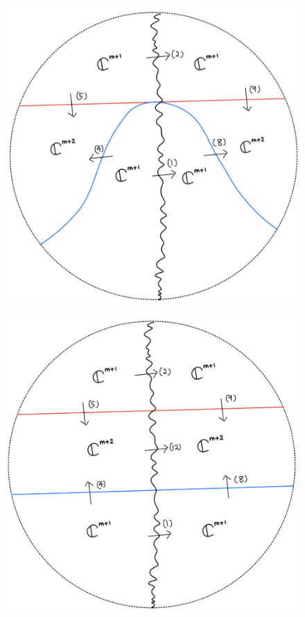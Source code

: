 \begin{figure}[H]
    \centering
    \includegraphics[scale = 0.45]{diagrams/lemma3/29.png} 
    \caption{}
    \label{fig:your-label}
\end{figure}
\begin{figure}[H]
    \centering
    \includegraphics[scale = 0.45]{diagrams/lemma3/30.png} 
    \caption{}
    \label{fig:your-label}
\end{figure}
